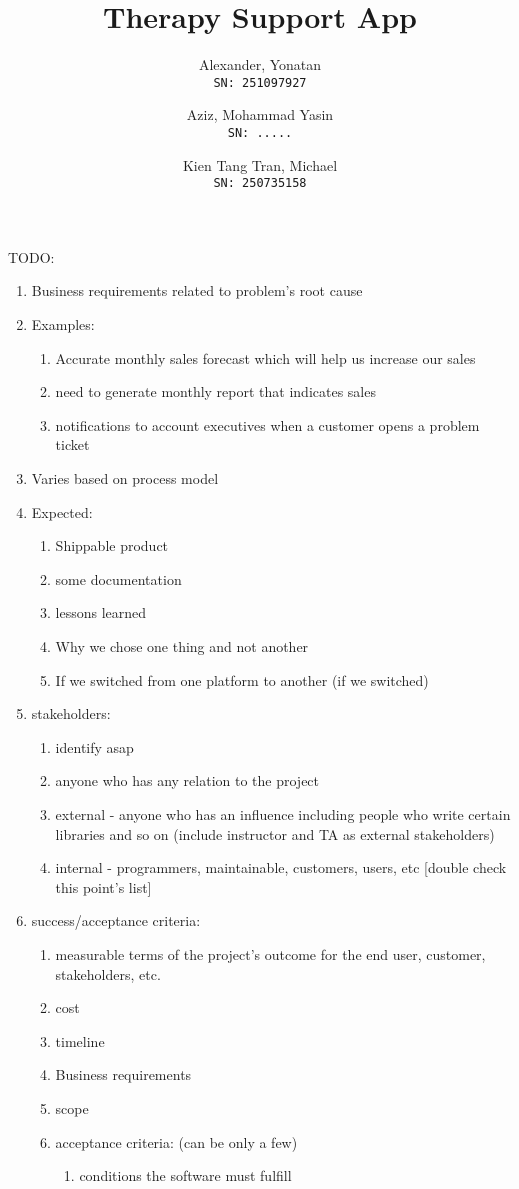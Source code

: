 \documentclass[11pt]{article}
\author{Alexander, Yonatan\\
\texttt{SN: 251097927}
\and
Aziz, Mohammad Yasin\\
\texttt{SN: .....}
\and
Kien Tang Tran, Michael\\
\texttt{SN: 250735158}
}
\title{Therapy Support App}
\begin{document}
     TODO:

    \begin{enumerate}
        \item Business requirements related to problem's root cause
        \item Examples:
        \begin{enumerate}
            \item Accurate monthly sales forecast which will help us increase our sales
            \item need to generate monthly report that indicates sales
            \item notifications to account executives when a customer opens a problem ticket
        \end{enumerate}
        \item Varies based on process model
        \item Expected:
        \begin{enumerate}
            \item Shippable product
            \item some documentation
            \item lessons learned
            \item Why we chose one thing and not another
            \item If we switched from one platform to another (if we switched)
        \end{enumerate}
        \item stakeholders:
        \begin{enumerate}
            \item identify asap
            \item anyone who has any relation to the project
            \item external - anyone who has an influence\; including people who write certain libraries and so on  (include instructor and TA as external stakeholders)
            \item internal - programmers, maintainable, customers, users, etc [double check this point's list]
        \end{enumerate}
        \item success/acceptance criteria:
        \begin{enumerate}
            \item measurable terms of the project's outcome for the end user, customer, stakeholders, etc.
            \item cost
            \item timeline
            \item Business requirements
            \item scope
            \item acceptance criteria: (can be only a few)
            \begin{enumerate}
                \item conditions the software must fulfill
            \end{enumerate}
        \end{enumerate}
    \end{enumerate}
\end{document}
